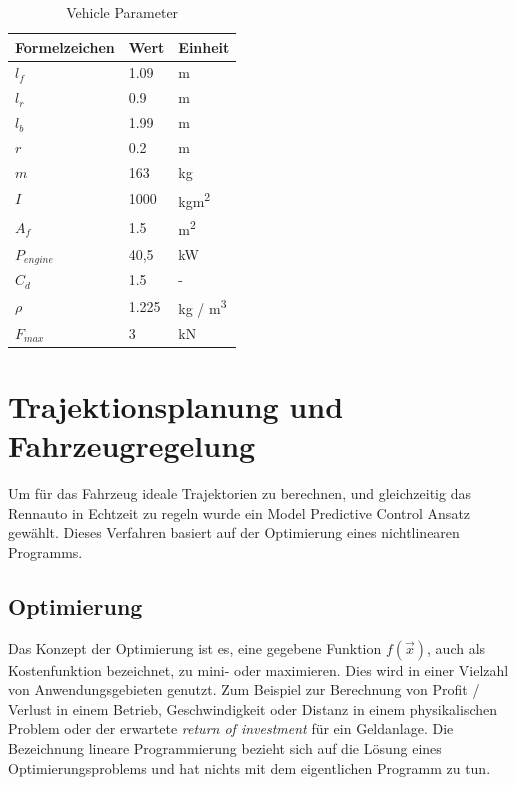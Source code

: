 \documentclass{like}
\begin{document}
\begin{table}[]
	\centering
	\begin{tabular}{l|l|l}
		\hline
		Formelzeichen	& Wert & Einheit \\ \hline
		\(l_f\)	&	1.09 & m\\
		\(l_r\)	&	0.9 & m\\
		\(l_b\)	&	1.99 & m \\
		\(r\)	&	0.2 & m \\
		\(m\)	&  	163 & kg\\
		\(I\)	&  	1000 & kgm\textsuperscript{2}\\
		\(A_f\)	&  	1.5 & m\textsuperscript{2}\\
		\(P_{engine}\) &  40,5 & kW\\
		\(C_d\)	&  	1.5 & - \\
		\(\rho\)	&  	1.225 & kg / m\textsuperscript{3}\\
		\(F_{max}\)	&  	3 & kN \\ 
	\end{tabular}
	\caption{Vehicle Parameter}
	\label{vehicleParam}
\end{table}







\chapter{Trajektionsplanung und Fahrzeugregelung}

Um für das Fahrzeug ideale Trajektorien zu berechnen, und gleichzeitig das Rennauto in Echtzeit zu regeln wurde ein Model Predictive Control Ansatz gewählt. Dieses Verfahren basiert auf der Optimierung eines nichtlinearen Programms.


\section{Optimierung}
Das Konzept der Optimierung ist es, eine gegebene Funktion \(f(\vec{x})\), auch als Kostenfunktion bezeichnet, zu mini- oder maximieren. 
Dies wird in einer Vielzahl von Anwendungsgebieten genutzt.
Zum Beispiel zur Berechnung von Profit / Verlust in einem Betrieb, Geschwindigkeit oder Distanz in einem physikalischen Problem oder der erwartete \textit{return of investment} für ein Geldanlage.  
Die Bezeichnung lineare Programmierung bezieht sich auf die Lösung eines  Optimierungsproblems und hat nichts mit dem eigentlichen Programm zu tun.
\end{document}
